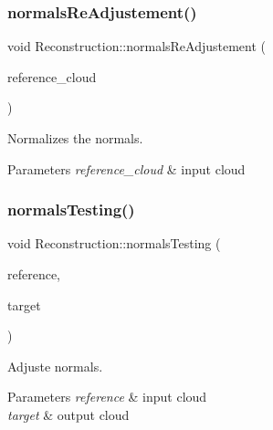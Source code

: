 \subsubsection{\texorpdfstring{normals\+Re\+Adjustement()}{normalsReAdjustement()}}
{\footnotesize\ttfamily void Reconstruction\+::normals\+Re\+Adjustement (\begin{DoxyParamCaption}\item[{pcl\+::\+Point\+Cloud$<$ pcl\+::\+Point\+X\+Y\+Z\+R\+G\+B\+Normal $>$\+::Ptr \&}]{reference\+\_\+cloud }\end{DoxyParamCaption})}



Normalizes the normals. 


\begin{DoxyParams}{Parameters}
{\em reference\+\_\+cloud} & input cloud \\
\hline
\end{DoxyParams}
\mbox{\label{classReconstruction_ab8b679093ca295de818b4bdf84ec79af}} 
\subsubsection{\texorpdfstring{normals\+Testing()}{normalsTesting()}}
{\footnotesize\ttfamily void Reconstruction\+::normals\+Testing (\begin{DoxyParamCaption}\item[{pcl\+::\+Point\+Cloud$<$ pcl\+::\+Point\+X\+Y\+Z\+R\+G\+B\+Normal $>$\+::Ptr \&}]{reference,  }\item[{pcl\+::\+Point\+Cloud$<$ pcl\+::\+Point\+X\+Y\+Z\+R\+G\+B\+Normal $>$\+::Ptr \&}]{target }\end{DoxyParamCaption})}



Adjuste normals. 


\begin{DoxyParams}{Parameters}
{\em reference} & input cloud \\
\hline
{\em target} & output cloud \\
\hline
\end{DoxyParams}
\mbox{\label{classReconstruction_aa2b56e19c016b8c32ff99e7c5bacb515}} 
